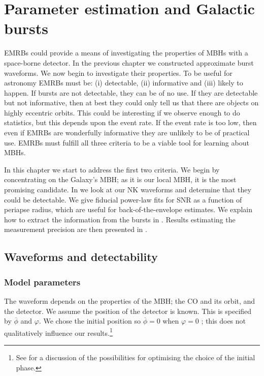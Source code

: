 \chapter{Parameter estimation and Galactic bursts}\label{ch:param}

EMRBs could provide a means of investigating the properties of MBHs with a space-borne detector. In the previous chapter we constructed approximate burst waveforms. We now begin to investigate their properties. To be useful for astronomy EMRBs must be: (i) detectable, (ii) informative and (iii) likely to happen. If bursts are not detectable, they can be of no use. If they are detectable but not informative, then at best they could only tell us that there are objects on highly eccentric orbits. This could be interesting if we observe enough to do statistics, but this depends upon the event rate. If the event rate is too low, then even if EMRBs are wonderfully informative they are unlikely to be of practical use. EMRBs must fulfill all three criteria to be a viable tool for learning about MBHs.

In this chapter we start to address the first two criteria. We begin by concentrating on the Galaxy's MBH; as it is our local MBH, it is the most promising candidate. In  we look at our NK waveforms and determine that they could be detectable. We give fiducial power-law fits for SNR as a function of periapse radius, which are useful for back-of-the-envelope estimates. We explain how to extract the information from the bursts in . Results estimating the measurement precision are then presented in .


\section{Waveforms and detectability}\label{sec:Waveforms}

\subsection{Model parameters}\label{sec:Mod-param}

The waveform depends on the properties of the MBH; the CO and its orbit, and the detector. We assume the position of the detector is known. This is specified by $\overline{\phi}$ and $\varphi$. We chose the initial position so $\overline{\phi} = 0$ when $\varphi = 0$ \citep{Cutler1998}; this does not qualitatively influence our results.\footnote{See \citet{Jani2013} for a discussion of the possibilities for optimising the choice of the initial phase.}

